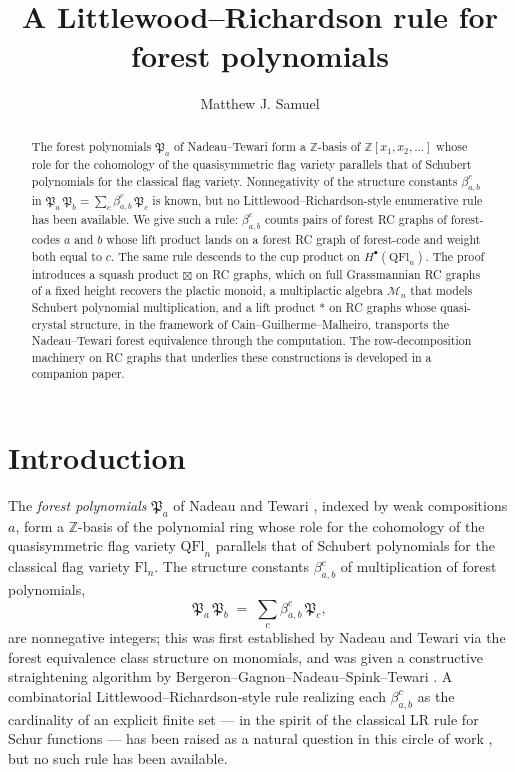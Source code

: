 \documentclass{amsart}
\title{A Littlewood--Richardson rule for forest polynomials}
\author{Matthew J. Samuel}
\theoremstyle{definition}
\theoremstyle{remark}
\numberwithin{equation}{subsection}
\newcommand{\forest}{\mathfrak{P}}
\begin{document}
\begin{abstract}
The forest polynomials $\forest_a$ of Nadeau--Tewari form a $\mathbb{Z}$-basis of $\mathbb{Z}[x_1,x_2,\ldots]$ whose role for the cohomology of the quasisymmetric flag variety parallels that of Schubert polynomials for the classical flag variety. Nonnegativity of the structure constants $\beta_{a,b}^c$ in $\forest_a\,\forest_b = \sum_c \beta_{a,b}^c\,\forest_c$ is known, but no Littlewood--Richardson-style enumerative rule has been available. We give such a rule: $\beta_{a,b}^c$ counts pairs of forest RC graphs of forest-codes $a$ and $b$ whose lift product lands on a forest RC graph of forest-code and weight both equal to $c$. The same rule descends to the cup product on $H^\bullet(\mathrm{QFl}_n)$. The proof introduces a squash product $\boxtimes$ on RC graphs, which on full Grassmannian RC graphs of a fixed height recovers the plactic monoid, a multiplactic algebra $\mathcal{M}_n$ that models Schubert polynomial multiplication, and a lift product $*$ on RC graphs whose quasi-crystal structure, in the framework of Cain--Guilherme--Malheiro, transports the Nadeau--Tewari forest equivalence through the computation. The row-decomposition machinery on RC graphs that underlies these constructions is developed in a companion paper.
\end{abstract}

	\maketitle


\section{Introduction}

The \emph{forest polynomials} $\forest_a$ of Nadeau and Tewari \cite{nadeau2024forest}, indexed by weak compositions $a$, form a $\mathbb{Z}$-basis of the polynomial ring whose role for the cohomology of the quasisymmetric flag variety $\mathrm{QFl}_n$ \cite{bergeron2025qsymflag} parallels that of Schubert polynomials for the classical flag variety $\mathrm{Fl}_n$. The structure constants $\beta_{a,b}^c$ of multiplication of forest polynomials,
$$\forest_a\,\forest_b \;=\; \sum_c \beta_{a,b}^c\,\forest_c,$$
are nonnegative integers; this was first established by Nadeau and Tewari \cite{nadeau2024forest} via the forest equivalence class structure on monomials, and was given a constructive straightening algorithm by Bergeron--Gagnon--Nadeau--Spink--Tewari \cite{bergeron2025equivariant}. A combinatorial Littlewood--Richardson-style rule realizing each $\beta_{a,b}^c$ as the cardinality of an explicit finite set --- in the spirit of the classical LR rule for Schur functions --- has been raised as a natural question in this circle of work \cite{nadeau2024forest,nadeau2024quasisymmetric,bergeron2025qsymflag}, but no such rule has been available.
\end{document}

